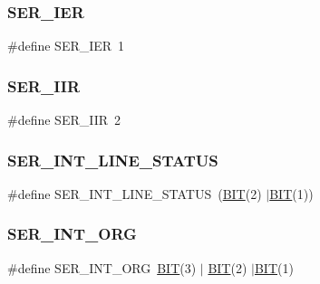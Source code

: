 \subsubsection{\texorpdfstring{S\+E\+R\+\_\+\+I\+ER}{SER\_IER}}
{\footnotesize\ttfamily \#define S\+E\+R\+\_\+\+I\+ER~1}

\hypertarget{group__ser__port_ga483c46ea5ed36388947426211cb63eab}{}\label{group__ser__port_ga483c46ea5ed36388947426211cb63eab} 
\subsubsection{\texorpdfstring{S\+E\+R\+\_\+\+I\+IR}{SER\_IIR}}
{\footnotesize\ttfamily \#define S\+E\+R\+\_\+\+I\+IR~2}

\hypertarget{group__ser__port_ga9cc69bb601e83e6539168370d49c71a5}{}\label{group__ser__port_ga9cc69bb601e83e6539168370d49c71a5} 
\subsubsection{\texorpdfstring{S\+E\+R\+\_\+\+I\+N\+T\+\_\+\+L\+I\+N\+E\+\_\+\+S\+T\+A\+T\+US}{SER\_INT\_LINE\_STATUS}}
{\footnotesize\ttfamily \#define S\+E\+R\+\_\+\+I\+N\+T\+\_\+\+L\+I\+N\+E\+\_\+\+S\+T\+A\+T\+US~(\hyperlink{video__gr_8c_a3a8ea58898cb58fc96013383d39f482c}{B\+IT}(2) $\vert$\hyperlink{video__gr_8c_a3a8ea58898cb58fc96013383d39f482c}{B\+IT}(1))}

\hypertarget{group__ser__port_ga92820a610e36c919d8a8cb2bb731e43e}{}\label{group__ser__port_ga92820a610e36c919d8a8cb2bb731e43e} 
\subsubsection{\texorpdfstring{S\+E\+R\+\_\+\+I\+N\+T\+\_\+\+O\+RG}{SER\_INT\_ORG}}
{\footnotesize\ttfamily \#define S\+E\+R\+\_\+\+I\+N\+T\+\_\+\+O\+RG~\hyperlink{video__gr_8c_a3a8ea58898cb58fc96013383d39f482c}{B\+IT}(3) $\vert$ \hyperlink{video__gr_8c_a3a8ea58898cb58fc96013383d39f482c}{B\+IT}(2) $\vert$\hyperlink{video__gr_8c_a3a8ea58898cb58fc96013383d39f482c}{B\+IT}(1)}

